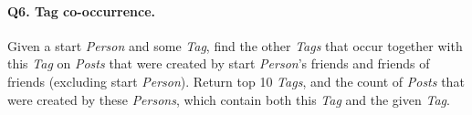\paragraph{\textbf{Q6}. Tag co-occurrence.}
Given a start \emph{Person} and some \emph{Tag}, find the other
\emph{Tags} that occur together with this \emph{Tag} on \emph{Posts}
that were created by start \emph{Person}'s friends and friends of
friends (excluding start \emph{Person}). Return top 10 \emph{Tags}, and
the count of \emph{Posts} that were created by these \emph{Persons},
which contain both this \emph{Tag} and the given \emph{Tag}.
